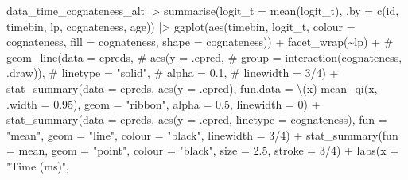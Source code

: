 \documentclass[
  letterpaper,
  DIV=11,
  numbers=noendperiod]{scrartcl}
\newenvironment{Shaded}{\begin{snugshade}}{\end{snugshade}}
\newcommand{\AttributeTok}[1]{\textcolor[rgb]{0.40,0.45,0.13}{#1}}
\newcommand{\CommentTok}[1]{\textcolor[rgb]{0.37,0.37,0.37}{#1}}
\newcommand{\DecValTok}[1]{\textcolor[rgb]{0.68,0.00,0.00}{#1}}
\newcommand{\FloatTok}[1]{\textcolor[rgb]{0.68,0.00,0.00}{#1}}
\newcommand{\FunctionTok}[1]{\textcolor[rgb]{0.28,0.35,0.67}{#1}}
\newcommand{\NormalTok}[1]{\textcolor[rgb]{0.00,0.23,0.31}{#1}}
\newcommand{\SpecialCharTok}[1]{\textcolor[rgb]{0.37,0.37,0.37}{#1}}
\newcommand{\StringTok}[1]{\textcolor[rgb]{0.13,0.47,0.30}{#1}}
\begin{document}
\begin{Shaded}
\begin{Highlighting}[]
\NormalTok{data\_time\_cognateness\_alt }\SpecialCharTok{|\textgreater{}} 
    \FunctionTok{summarise}\NormalTok{(}\AttributeTok{logit\_t =} \FunctionTok{mean}\NormalTok{(logit\_t),}
              \AttributeTok{.by =} \FunctionTok{c}\NormalTok{(id, timebin, lp, cognateness, age)) }\SpecialCharTok{|\textgreater{}} 
    \FunctionTok{ggplot}\NormalTok{(}\FunctionTok{aes}\NormalTok{(timebin, logit\_t, }
               \AttributeTok{colour =}\NormalTok{ cognateness,}
               \AttributeTok{fill =}\NormalTok{ cognateness,}
               \AttributeTok{shape =}\NormalTok{ cognateness)) }\SpecialCharTok{+}
    \FunctionTok{facet\_wrap}\NormalTok{(}\SpecialCharTok{\textasciitilde{}}\NormalTok{lp) }\SpecialCharTok{+}
    \CommentTok{\# geom\_line(data = epreds,}
    \CommentTok{\#         aes(y = .epred,}
    \CommentTok{\#           group = interaction(cognateness, .draw)),}
    \CommentTok{\#         linetype = "solid",}
    \CommentTok{\#         alpha = 0.1,}
    \CommentTok{\#         linewidth = 3/4) +}
    \FunctionTok{stat\_summary}\NormalTok{(}\AttributeTok{data =}\NormalTok{ epreds,}
                 \FunctionTok{aes}\NormalTok{(}\AttributeTok{y =}\NormalTok{ .epred),}
                 \AttributeTok{fun.data =}\NormalTok{ \textbackslash{}(x) }\FunctionTok{mean\_qi}\NormalTok{(x, }\AttributeTok{.width =} \FloatTok{0.95}\NormalTok{),}
                 \AttributeTok{geom =} \StringTok{"ribbon"}\NormalTok{,}
                 \AttributeTok{alpha =} \FloatTok{0.5}\NormalTok{,}
                 \AttributeTok{linewidth =} \DecValTok{0}\NormalTok{) }\SpecialCharTok{+}
    \FunctionTok{stat\_summary}\NormalTok{(}\AttributeTok{data =}\NormalTok{ epreds,}
                 \FunctionTok{aes}\NormalTok{(}\AttributeTok{y =}\NormalTok{ .epred,}
                    \AttributeTok{linetype =}\NormalTok{ cognateness),}
                 \AttributeTok{fun =} \StringTok{"mean"}\NormalTok{,}
                 \AttributeTok{geom =} \StringTok{"line"}\NormalTok{,}
                 \AttributeTok{colour =} \StringTok{"black"}\NormalTok{,}
                 \AttributeTok{linewidth =} \DecValTok{3}\SpecialCharTok{/}\DecValTok{4}\NormalTok{) }\SpecialCharTok{+}
    \FunctionTok{stat\_summary}\NormalTok{(}\AttributeTok{fun =}\NormalTok{ mean,}
                 \AttributeTok{geom =} \StringTok{"point"}\NormalTok{,}
                 \AttributeTok{colour =} \StringTok{"black"}\NormalTok{,}
                 \AttributeTok{size =} \FloatTok{2.5}\NormalTok{,}
                 \AttributeTok{stroke =} \DecValTok{3}\SpecialCharTok{/}\DecValTok{4}\NormalTok{) }\SpecialCharTok{+}
    \FunctionTok{labs}\NormalTok{(}\AttributeTok{x =} \StringTok{"Time (ms)"}\NormalTok{,}

\end{Highlighting}
\end{Shaded}
\end{document}
